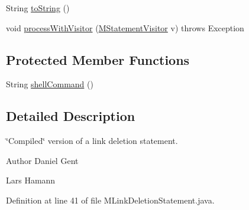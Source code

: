 \begin{DoxyCompactItemize}
\item 
String \hyperlink{classorg_1_1tzi_1_1use_1_1uml_1_1sys_1_1soil_1_1_m_link_deletion_statement_ae048143c9abbcf90eb24e4c92500a488}{to\-String} ()
\item 
void \hyperlink{classorg_1_1tzi_1_1use_1_1uml_1_1sys_1_1soil_1_1_m_link_deletion_statement_a71c7b32cea1198d969d15421b2b53a28}{process\-With\-Visitor} (\hyperlink{interfaceorg_1_1tzi_1_1use_1_1uml_1_1sys_1_1soil_1_1_m_statement_visitor}{M\-Statement\-Visitor} v)  throws Exception 
\end{DoxyCompactItemize}
\subsection*{Protected Member Functions}
\begin{DoxyCompactItemize}
\item 
String \hyperlink{classorg_1_1tzi_1_1use_1_1uml_1_1sys_1_1soil_1_1_m_link_deletion_statement_a1ecbbb86ed7e68a1d980e7406323234a}{shell\-Command} ()
\end{DoxyCompactItemize}


\subsection{Detailed Description}
\char`\"{}\-Compiled\char`\"{} version of a link deletion statement. \begin{DoxyAuthor}{Author}
Daniel Gent 

Lars Hamann 
\end{DoxyAuthor}


Definition at line 41 of file M\-Link\-Deletion\-Statement.\-java.




